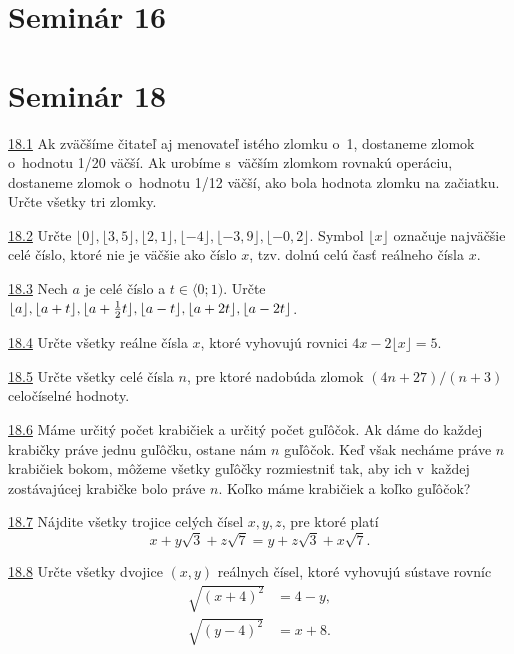 \section*{Seminár 16}

\section*{Seminár 18}

\noindent \ul{18.1} 
 Ak zväčšíme čitateľ aj menovateľ istého zlomku o~1, dostaneme zlomok o~hodnotu 1/20 väčší. Ak urobíme s~väčším zlomkom rovnakú operáciu, dostaneme zlomok o~hodnotu 1/12 väčší, ako bola hodnota zlomku na začiatku. Určte všetky tri zlomky.




\noindent \ul{18.2}  Určte $\lfloor 0 \rfloor, \lfloor 3{,}5 \rfloor,\lfloor 2{,}1\rfloor, \lfloor -4 \rfloor, \lfloor -3{,}9 \rfloor, \lfloor -0{,}2\rfloor$. Symbol $\lfloor x\rfloor$ označuje najväčšie celé číslo, ktoré nie je väčšie ako číslo $x$, tzv. dolnú celú časť reálneho čísla $x$.




\noindent \ul{18.3}  Nech $a$ je celé číslo a $t \in \langle 0; 1)$. Určte $\lfloor a \rfloor, \lfloor a+t \rfloor,\lfloor a+\frac{1}{2}t\rfloor, \lfloor a-t \rfloor, \\ \lfloor a+2t \rfloor, \lfloor a-2t\rfloor$.




\noindent \ul{18.4} 
Určte všetky reálne čísla $x$, ktoré vyhovujú rovnici $4x - 2\lfloor x\rfloor = 5$.




\noindent \ul{18.5}  Určte všetky celé čísla $n$, pre ktoré nadobúda zlomok $(4n + 27)/(n + 3)$ celočíselné
hodnoty.




\noindent \ul{18.6} 
Máme určitý počet krabičiek a určitý počet guľôčok. Ak dáme do každej krabičky práve jednu guľôčku, ostane nám $n$ guľôčok. Keď však necháme práve $n$ krabičiek bokom, môžeme všetky guľôčky rozmiestniť tak, aby ich v~každej zostávajúcej krabičke bolo práve $n$. Koľko máme krabičiek a koľko guľôčok?




\noindent \ul{18.7} 
Nájdite všetky trojice celých čísel $x, y, z$, pre ktoré platí
$$x+y\sqrt{3}+z\sqrt{7}=y+z\sqrt{3}+x\sqrt{7}. $$



\noindent \ul{18.8} 
Určte všetky dvojice $(x, y)$ reálnych čísel, ktoré vyhovujú sústave rovníc
\begin{align*}
\sqrt{(x + 4)^2} &= 4 - y,\\
\sqrt{(y - 4)^2} &= x + 8.
\end{align*}




